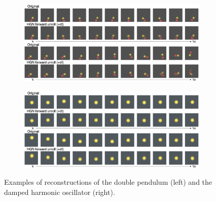 \begin{figure}
    \centering
        \begin{subfigure}{.48\textwidth}
        \centering
        \includegraphics[width=\linewidth]{../openreview/pictures/rollout_samples/new_chaotic_pendulum_rollouts.png}
        \label{fig:a}
    \end{subfigure}
    \begin{subfigure}{.48\textwidth}
        \centering
        \includegraphics[width=\linewidth]{../openreview/pictures/rollout_samples/new_damped_spring_sample_rollout.png}
        \label{fig:b}
    \end{subfigure}
    \caption{Examples of reconstructions of the double pendulum (left) and the damped harmonic oscillator (right).}
    \label{fig:extra}
\end{figure}
